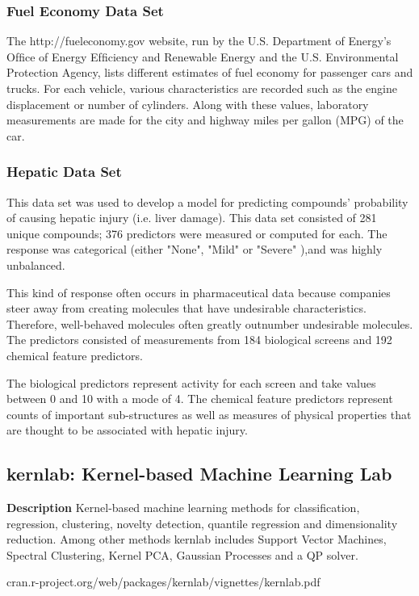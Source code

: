 \documentclass[caret-main.tex]{subfiles}
\begin{document}
\subsubsection{Fuel Economy Data Set}
The http://fueleconomy.gov website, run by the U.S. Department of Energy’s Ofﬁce of Energy
Efﬁciency and Renewable Energy and the U.S. Environmental Protection Agency, lists different
estimates of fuel economy for passenger cars and trucks. For each vehicle, various characteristics
are recorded such as the engine displacement or number of cylinders. Along with these values,
laboratory measurements are made for the city and highway miles per gallon (MPG) of the car.

\subsubsection{Hepatic Data Set}
This data set was used to develop a model for predicting compounds’ probability of causing hepatic
injury (i.e. liver damage). This data set consisted of 281 unique compounds; 376 predictors were
measured or computed for each. The response was categorical (either "None", "Mild" or "Severe"
),and was highly unbalanced.

This kind of response often occurs in pharmaceutical data because companies steer away from
creating molecules that have undesirable characteristics. Therefore, well-behaved molecules often
greatly outnumber undesirable molecules. The predictors consisted of measurements from 184
biological screens and 192 chemical feature predictors. 

The biological predictors represent activity for each screen and take values between 0 and 10 with a mode of 4.  The chemical feature predictors represent counts of important sub-structures as well as measures of physical properties that are thought to be 
associated 
with hepatic injury.
\subsection{kernlab: Kernel-based Machine Learning Lab}


\textbf{Description} Kernel-based machine learning methods for classification, regression, clustering, novelty detection, quantile regression and dimensionality reduction. Among other methods kernlab includes Support Vector Machines, Spectral Clustering, Kernel PCA, Gaussian Processes and a QP solver.

cran.r-project.org/web/packages/kernlab/vignettes/kernlab.pdf
\end{document}
